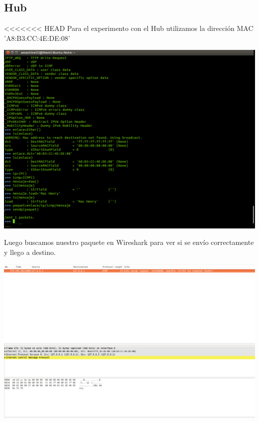 \documentclass[spanish]{udpreport}
\begin{document}
\pagebreak

\subsection{Hub}

<<<<<<< HEAD
Para el experimento con el Hub utilizamos la dirección MAC 'A8:B3:CC:4E:DE:08'

\begin{center}
	\includegraphics[scale=.27]{imagenes/Hub/sendmanti.png}
	\\
\end{center}

Luego buscamos nuestro paquete en Wireshark para ver si se envío correctamente y llego a destino.\\

\begin{center}
	\includegraphics[scale=.27]{imagenes/Hub/ipmanti.png}
\end{center}
\end{document}
